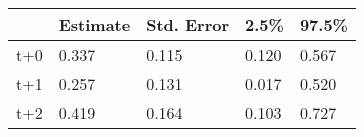 \begin{tabular}{lllll}
  \toprule
  & Estimate & Std. Error & 2.5\% & 97.5\% \\ 
  \midrule
t+0 & 0.337 & 0.115 & 0.120 & 0.567 \\ 
  t+1 & 0.257 & 0.131 & 0.017 & 0.520 \\ 
  t+2 & 0.419 & 0.164 & 0.103 & 0.727 \\ 
   \bottomrule
\end{tabular}
